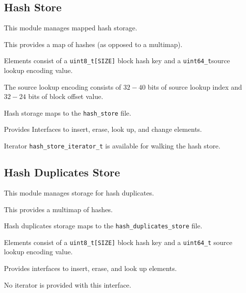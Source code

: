 \documentclass[12pt,twoside]{article}
\begin{document}
\subsection{Hash Store}
This module manages mapped hash storage.
\begin{compactitem}
\item This provides a map of hashes (as opposed to a multimap).
\item Elements consist of a
\texttt{uint8\_t[SIZE]} block hash key and a
\texttt{uint64\_t}source lookup encoding value.
\item The source lookup encoding consists of $32-40$ bits
of source lookup index and $32-24$ bits of block offset value.
\item Hash storage maps to the \texttt{hash\_store} file.
\item Provides Interfaces to insert, erase, look up, and change elements.
\item Iterator \texttt{hash\_store\_iterator\_t} is available
for walking the hash store.
\end{compactitem}

\subsection{Hash Duplicates Store}
This module manages storage for hash duplicates.
\begin{compactitem}
\item This provides a multimap of hashes.
\item Hash duplicates storage maps to the \texttt{hash\_duplicates\_store} file.
\item Elements consist of a
\texttt{uint8\_t[SIZE]} block hash key and a
\texttt{uint64\_t} source lookup encoding value.
\item Provides interfaces to insert, erase, and look up elements.
\item No iterator is provided with this interface.
\end{compactitem}

\end{document}
